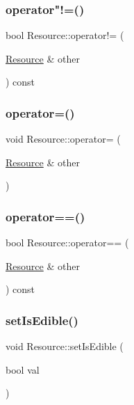 \mbox{\label{class_resource_a3c75951bdaba141f3382023f6f99b456}} 
\subsubsection{\texorpdfstring{operator"!=()}{operator!=()}}
{\footnotesize\ttfamily bool Resource\+::operator!= (\begin{DoxyParamCaption}\item[{\mbox{\hyperlink{class_resource}{Resource}} \&}]{other }\end{DoxyParamCaption}) const}

\mbox{\label{class_resource_aaeb9617a6d1340121b1752893a2acaa5}} 
\subsubsection{\texorpdfstring{operator=()}{operator=()}}
{\footnotesize\ttfamily void Resource\+::operator= (\begin{DoxyParamCaption}\item[{\mbox{\hyperlink{class_resource}{Resource}} \&}]{other }\end{DoxyParamCaption})}

\mbox{\label{class_resource_a4bdd94c900d474b46b3be82cf7d2b177}} 
\subsubsection{\texorpdfstring{operator==()}{operator==()}}
{\footnotesize\ttfamily bool Resource\+::operator== (\begin{DoxyParamCaption}\item[{\mbox{\hyperlink{class_resource}{Resource}} \&}]{other }\end{DoxyParamCaption}) const}

\mbox{\label{class_resource_a1dab6f1bc6f8794735a6e64c43415587}} 
\subsubsection{\texorpdfstring{set\+Is\+Edible()}{setIsEdible()}}
{\footnotesize\ttfamily void Resource\+::set\+Is\+Edible (\begin{DoxyParamCaption}\item[{bool}]{val }\end{DoxyParamCaption})}

